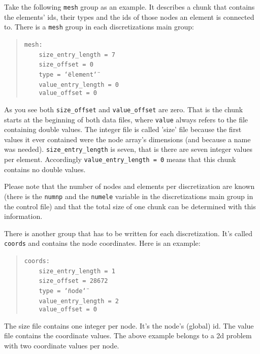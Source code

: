 Take the following \texttt{mesh} group as an example. It describes
a chunk that contains the elements' ids, their types and the ids of
those nodes an element is connected to. There is a \texttt{mesh} group
in each discretizations main group: 

\begin{quote}
\texttt{mesh:~}~\\
 \texttt{~~~~size{\_}entry{\_}length~=~7~}~\\
 \texttt{~~~~size{\_}offset~=~0~}~\\
 \texttt{~~~~type~=~\char`\"{}element\char`\"{}~}~\\
 \texttt{~~~~value{\_}entry{\_}length~=~0~}~\\
 \texttt{~~~~value{\_}offset~=~0 }
\end{quote}
As you see both \texttt{size{\_}offset} and \texttt{value{\_}offset}
are zero. That is the chunk starts at the beginning of both data files,
where \texttt{value} always refers to the file containing double values.
The integer file is called 'size' file because the first values it
ever contained were the node array's dimensions (and because a name
was needed). \texttt{size{\_}entry{\_}length} is seven, that is
there are seven integer values per element. Accordingly \texttt{value{\_}entry{\_}length
= 0} means that this chunk contains no double values.

Please note that the number of nodes and elements per discretization
are known (there is the \texttt{numnp} and the \texttt{numele} variable
in the discretizations main group in the control file) and that the
total size of one chunk can be determined with this information.

There is another group that has to be written for each discretization.
It's called \texttt{coords} and contains the node coordinates. Here
is an example: 

\begin{quote}
\texttt{coords:~}~\\
 \texttt{~~~~size{\_}entry{\_}length~=~1~}~\\
 \texttt{~~~~size{\_}offset~=~28672~}~\\
 \texttt{~~~~type~=~\char`\"{}node\char`\"{}~}~\\
 \texttt{~~~~value{\_}entry{\_}length~=~2~}~\\
 \texttt{~~~~value{\_}offset~=~0 }
\end{quote}
The size file contains one integer per node. It's the node's (global)
id. The value file contains the coordinate values. The above example
belongs to a 2d problem with two coordinate values per node.

